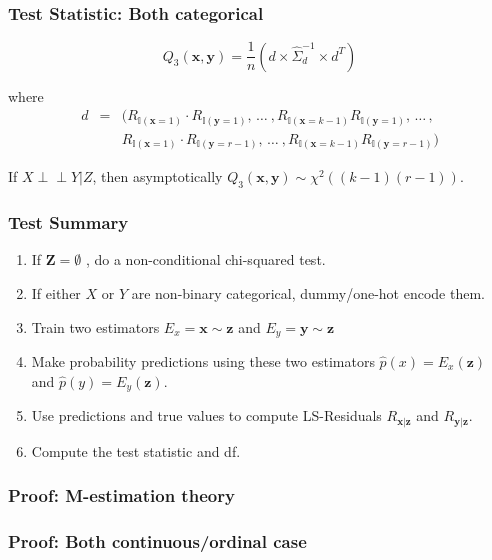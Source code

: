 \documentclass{beamer}
\def\ci{\perp\!\!\!\!\!\perp}
\begin{document}
\begin{frame}
	\frametitle{Test Statistic: Both categorical}

	$$ Q_3(\bm{x}, \bm{y}) = \frac{1}{n} (d \times \hat{\Sigma}_d^{-1} \times d^T) $$

	where 
	\begin{eqnarray*}
		d &  =  & (R_{\mathbb{I}(\mathbf{x}=1)} \cdot R_{\mathbb{I}(\mathbf{y}=1)}, \, \ldots \ ,
		R_{\mathbb{I}(\mathbf{x}=k-1)} R_{\mathbb{I}(\mathbf{y}=1)}, \, \ldots \, ,
		\\
	 	& & R_{\mathbb{I}(\mathbf{x}=1)} \cdot R_{\mathbb{I}(\mathbf{y}=r-1)}, \, \ldots \ ,
		R_{\mathbb{I}(\mathbf{x}=k-1)} R_{\mathbb{I}(\mathbf{y}=r-1)}
		)
	\end{eqnarray*}
	\vspace{1em}

	\begin{center}
	If $ X \ci Y | Z $, then asymptotically $ Q_3(\bm{x}, \bm{y}) \sim \chi^2((k-1)(r-1)) $.
	\end{center}

\end{frame}

\begin{frame}
	\frametitle{Test Summary}
	\begin{enumerate}
		\setlength\itemsep{1em}
		\item If $\mathbf{Z} = \emptyset $ , do a non-conditional chi-squared test.
		\item If either $ X $ or $ Y $ are non-binary categorical,
			dummy/one-hot encode them.
		\item Train two estimators $ E_x = \bm{x} \sim \bm{z} $ and
			$ E_y = \bm{y} \sim \bm{z} $
		\item Make probability predictions using these two estimators 
			$ \hat{p}(x) = E_x(\bm{z}) $ and $ \hat{p}(y) =
			E_y(\bm{\bm{z}}) $.
		\item Use predictions and true values to compute LS-Residuals $ R_{\bm{x}|\bm{z}} $ and $ R_{\bm{y}|\bm{z}} $.	
		\item Compute the test statistic and df.
	\end{enumerate}
\end{frame}

\begin{frame}
	\frametitle{Proof: M-estimation theory}
\end{frame}

\begin{frame}
	\frametitle{Proof: Both continuous/ordinal case}
\end{frame}
\end{document}

